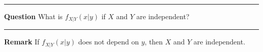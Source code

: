 \documentclass[12pt]{amsart}
\newcommand\pdfXgY{f_{X|Y}(x|y)}
\begin{document}
{%
\vspace{13cm}
\hrule
\vspace{.5cm}
\textbf{Question}\newline
What is $\pdfXgY$ if $X$ and $Y$ are independent?




\vspace{5cm}
\hrule
\vspace{.5cm}
\textbf{Remark}\newline
If $\pdfXgY$ does not depend on $y$, then $X$ and $Y$ are independent.


\newpage

}  %
\end{document}
